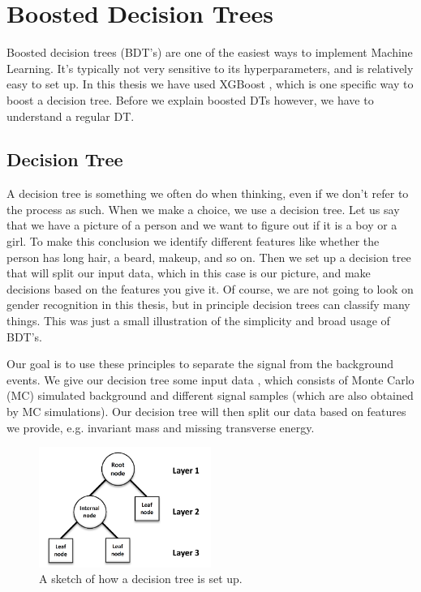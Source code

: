 \section{Boosted Decision Trees}
\label{sec:BDT}

Boosted decision trees (BDT's) are one of the easiest ways to implement Machine Learning. It's typically not very sensitive to its hyperparameters, and is relatively easy to set up. In this thesis we have used XGBoost \cite{xgboostAbout}, which is one specific way to boost a decision tree. Before we explain boosted DTs however, we have to understand a regular DT.


\subsection{Decision Tree}

A decision tree is something we often do when thinking, even if we don't refer to the process as such. When we make a choice, we use a decision tree. Let us say that we have a picture of a person and we want to figure out if it is a boy or a girl. To make this conclusion we identify different features like whether the person has long hair, a beard, makeup, and so on. Then we set up a decision tree that will split our input data, which in this case is our picture, and make decisions based on the features you give it. Of course, we are not going to look on gender recognition in this thesis, but in principle decision trees can classify many things. This was just a small illustration of the simplicity and broad usage of BDT's.

Our goal is to use these principles to separate the signal from the background events. We give our decision tree some input data \cite{DTppt}, which consists of Monte Carlo (MC) simulated background and different signal samples (which are also obtained by MC simulations). Our decision tree will then split our data based on features we provide, e.g. invariant mass and missing transverse energy. 

\begin{figure}[H]
    \centering
    \includegraphics[width=0.5\textwidth]{Figures/FromOnline/Basic-structure-of-a-decision-tree-All-decision-trees-are-built-through-recursion.png}
    \caption{A sketch of how a decision tree is set up. \cite{DTpic}}
    \label{fig:DTpic}
\end{figure}

